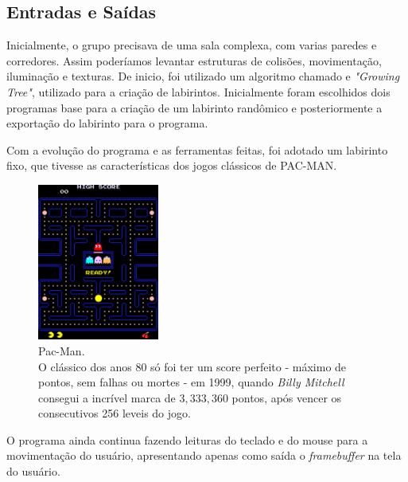 \subsection{Entradas e Saídas}\label{inputs}

Inicialmente, o grupo precisava de uma sala complexa, com varias paredes e corredores. Assim poderíamos levantar estruturas de colisões, movimentação, iluminação e texturas. De inicio, foi utilizado um algoritmo chamado e \textit{"Growing Tree"}, utilizado para a criação de labirintos. Inicialmente foram escolhidos dois programas base para a criação de um labirinto randômico e posteriormente a exportação do labirinto para o programa.

Com a evolução do programa e as ferramentas feitas, foi adotado um labirinto fixo, que tivesse as características dos jogos clássicos de PAC-MAN.

\begin{figure} %
  \centering
  \includegraphics[width=4cm]{./fts/lvl1}
  \caption{Pac-Man.\\O clássico dos anos 80 só foi ter um score perfeito - máximo de pontos, sem falhas ou mortes - em 1999, quando \textit{Billy Mitchell} consegui a incrível marca de $3,333,360$ pontos, após vencer os consecutivos 256 leveis do jogo.}
  \label{pac1}
\end{figure}

O programa ainda continua fazendo leituras do teclado e do mouse para a movimentação do usuário, apresentando apenas como saída o \textit{framebuffer} na tela do usuário.





